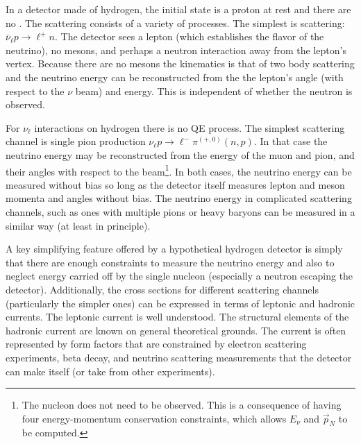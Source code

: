 
In a detector made of hydrogen, the initial state is a proton at rest and there are no . The scattering consists of a variety of processes. The simplest is  scattering: $\bar{\nu}_\ell p \to \ell^+ n$. The detector sees a lepton (which establishes the flavor of the neutrino), no mesons, and perhaps a neutron interaction away from the lepton's vertex. Because there are no mesons the kinematics is that of two body scattering and the neutrino energy can be reconstructed from the the lepton's angle (with respect to the $\nu$ beam) and energy. This is independent of whether the neutron is observed.

For $\nu_\ell$ interactions on hydrogen there is no QE process. The simplest scattering channel is single pion production $\nu_\ell p \to \ell^- \pi^{(+,0)} (n,p)$. In that case the neutrino energy may be reconstructed from the energy of the muon and pion, and their angles with respect to the beam\footnote{The nucleon does not need to be observed. This is a consequence of having four energy-momentum conservation constraints, which allows $E_\nu$ and $\vec{p}_N$ to be computed.}. In both cases, the neutrino energy can be measured without bias so long as the detector itself measures lepton and meson momenta and angles without bias.  The neutrino energy in complicated scattering channels, such as ones with multiple pions or heavy baryons can be measured in a similar way (at least in principle).

A key simplifying feature offered by a hypothetical hydrogen detector is simply that there are enough constraints to measure the neutrino energy and also to neglect energy carried off by the single nucleon (especially a neutron escaping the detector). Additionally, the cross sections for different scattering channels (particularly the simpler ones) can be expressed in terms of leptonic and hadronic currents. The leptonic current is well understood. The structural elements of the hadronic current are known on general theoretical grounds. The current is often represented by form factors that are constrained by electron scattering experiments, beta decay, and neutrino scattering measurements that the detector can make itself (or take from other experiments). 



